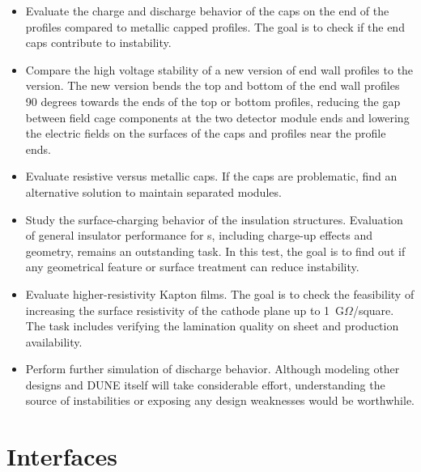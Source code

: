 \begin{itemize}
\item Evaluate the charge and discharge behavior of the  caps on the end of the profiles compared to metallic capped profiles.  The goal is to check if the end caps contribute to  instability. 

\item Compare the high voltage stability of a new version of end wall profiles to the  version.  The new version bends the top and bottom of the end wall profiles 90 degrees towards the ends of the top or bottom profiles, reducing the gap between field cage components at the two detector module ends and lowering the electric fields on the surfaces of the  caps and profiles near the profile ends.
\item Evaluate resistive versus metallic caps.  If the  caps are %
problematic, find an alternative solution to maintain separated  modules.
\item Study the surface-charging behavior of the  insulation structures.  Evaluation of general insulator performance for \lartpc{}s, including charge-up effects and geometry, remains an outstanding task.  In this test, the goal is to find out if any geometrical feature or surface treatment can reduce  instability.
\item Evaluate higher-resistivity Kapton films.  The goal is to check the feasibility of increasing the surface resistivity of the cathode plane up to 1~G$\Omega$/square.  The task includes verifying the lamination quality on \frfour sheet and production availability.
\item Perform further simulation of   discharge behavior. Although modeling other  designs and DUNE itself will take considerable effort, %
understanding the source of instabilities or exposing any design weaknesses would be worthwhile. %
\end{itemize}

\section{Interfaces }
\label{sec:fdsp-hv-intfc}



